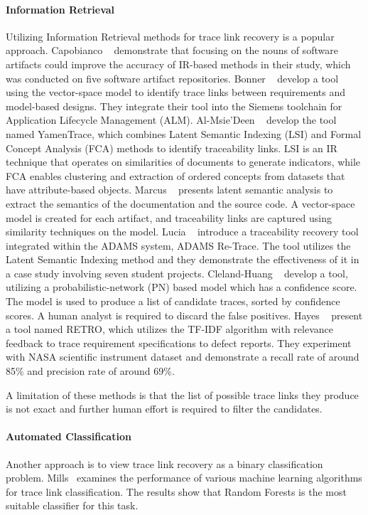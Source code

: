 \paragraph{Information Retrieval} Utilizing Information Retrieval methods for trace link recovery is a popular approach.
Capobianco \etal{}~\cite{capobianco-2013} demonstrate that focusing on the nouns of software artifacts could improve the accuracy of IR-based methods in their study, which was conducted on five software artifact repositories.
Bonner \etal{}~\cite{bonner-2023} develop a tool using the vector-space model to identify trace links between requirements and model-based designs. They integrate their tool into the Siemens toolchain for Application Lifecycle Management (ALM).
Al-Msie'Deen \etal{}~\cite{deen-2023} develop the tool named YamenTrace, which combines Latent Semantic Indexing (LSI) and Formal Concept Analysis (FCA) methods to identify traceability links. LSI is an IR technique that operates on similarities of documents to generate indicators, while FCA enables clustering and extraction of ordered concepts from datasets that have attribute-based objects. 
Marcus \etal{}~\cite{marcus-2003} presents latent semantic analysis to extract the semantics of the documentation and the source code. A vector-space model is created for each artifact, and traceability links are captured using similarity techniques on the model.
Lucia \etal{}~\cite{fasano-2005} introduce a traceability recovery tool integrated within the ADAMS system, ADAMS Re-Trace. The tool utilizes the Latent Semantic Indexing method and they demonstrate the effectiveness of it in a case study involving seven student projects.
Cleland-Huang \etal{}~\cite{cleland-huang-2007} develop a tool, utilizing a probabilistic-network (PN) based model which has a confidence score. The model is used to produce a list of candidate traces, sorted by confidence scores. A human analyst is required to discard the false positives. Hayes \etal{}~\cite{hayes-2005} present a tool named RETRO, which utilizes the TF-IDF algorithm with relevance feedback to trace requirement specifications to defect reports. They experiment with NASA scientific instrument dataset and demonstrate a recall rate of around 85\% and precision rate of around 69\%.

A limitation of these methods is that the list of possible trace links they produce is not exact and further human effort is required to filter the candidates.

\paragraph{Automated Classification} Another approach is to view trace link recovery as a binary classification problem. Mills~\cite{mills-2017} examines the performance of various machine learning algorithms for trace link classification. The results show that Random Forests is the most suitable classifier for this task.

